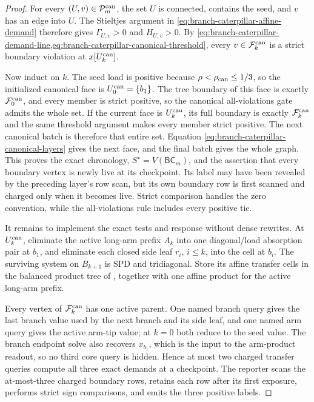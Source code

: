\begin{proof}
For every $(U,v)\in\mathcal P_m^{\rm can}$, the set $U$ is connected,
contains the seed, and $v$ has an edge into $U$.  The Stieltjes argument in
\eqref{eq:branch-caterpillar-affine-demand} therefore gives
$\Gamma_{U,v}>0$ and $H_{U,v}>0$.  By
\cref{eq:branch-caterpillar-demand-line,eq:branch-caterpillar-canonical-threshold},
every $v\in\mathcal F_k^{\rm can}$ is a strict boundary violation at
$x[U_k^{\rm can}]$.

Now induct on $k$.  The seed load is positive because
$\rho<\rho_{\rm can}\leq1/3$, so the initialized canonical face is
$U_0^{\rm can}=\{b_1\}$.  The tree boundary of this face is exactly
$\mathcal F_0^{\rm can}$, and every member is strict positive, so the
canonical all-violations gate admits the whole set.  If the current face is
$U_k^{\rm can}$, its full boundary is exactly
$\mathcal F_k^{\rm can}$ and the same threshold argument makes every member
strict positive.  The next canonical batch is therefore that entire set.
Equation \eqref{eq:branch-caterpillar-canonical-layers} gives the next face,
and the final batch gives the whole graph.  This proves the exact chronology,
$S^\star=V(\mathsf{BC}_m)$, and the assertion that every boundary vertex is
newly live at its checkpoint.  Its label may have been revealed by the
preceding layer's row scan, but its own boundary row is first scanned and
charged only when it becomes live.  Strict comparison handles the zero
convention, while the all-violations rule includes every positive tie.

It remains to implement the exact tests and response without dense rewrites.
At $U_k^{\rm can}$, eliminate the active long-arm prefix $A_k$ into one
diagonal/load absorption pair at $b_1$, and eliminate each closed side leaf
$r_i$, $i\leq k$, into the cell at $b_i$.  The surviving system on
$B_{k+1}$ is SPD and tridiagonal.  Store its affine transfer cells in the
balanced product tree of
, together with one
affine product for the active long-arm prefix.

Every vertex of $\mathcal F_k^{\rm can}$ has one active parent.  One named
branch query gives the last branch value used by the next branch and its side
leaf, and one named arm query gives the active arm-tip value; at $k=0$ both
reduce to the seed value.  The branch endpoint solve also recovers $x_{b_1}$,
which is the input to the arm-product readout, so no third core query is
hidden.  Hence at most two charged transfer queries compute
all three exact demands at a checkpoint.  The reporter scans the at-most-three
charged boundary rows, retains each row after its first exposure, performs
strict sign comparisons, and emits the three positive labels.


\end{proof}
